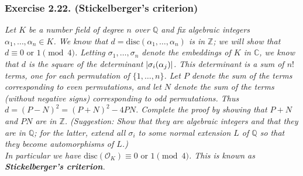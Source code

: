 \documentclass{article}
\begin{document}





\subsubsection*{Exercise 2.22. (Stickelberger's criterion)}
\emph{Let $K$ be a number field of degree $n$ over $\mathbb{Q}$ and
fix algebraic integers $\alpha_1, \ldots, \alpha_n \in K$.
We know that $d = \mathrm{disc}(\alpha_1, \ldots, \alpha_n)$ is in $\mathbb{Z}$;
we will show that $d \equiv 0 \text{ or } 1 \pmod{4}$.
Letting $\sigma_1, \ldots, \sigma_n$ denote the embeddings of $K$ in $\mathbb{C}$,
we know that $d$ is the square of the determinant $\abs{\sigma_i(\alpha_j)}$.
This determinant is a sum of $n!$ terms,
one for each permutation of $\{1, \ldots, n \}$.
Let $P$ denote the sum of the terms corresponding to even permutations,
and let $N$ denote the sum of the terms (without negative signs) corresponding to odd permutations.
Thus $d = (P-N)^2 = (P+N)^2 - 4PN$.
Complete the proof by showing that $P+N$ and $PN$ are in $\mathbb{Z}$.
(Suggestion: Show that they are algebraic integers and that they are in $\mathbb{Q}$;
for the latter, extend all $\sigma_i$ to some normal extension $L$ of $\mathbb{Q}$ so that
they become automorphisms of $L$.)} \\

\emph{In particular we have $\mathrm{disc}(\mathcal{O}_K) \equiv 0 \text{ or } 1 \pmod{4}$.
This is known as \textbf{Stickelberger's criterion}.} \\
\end{document}
